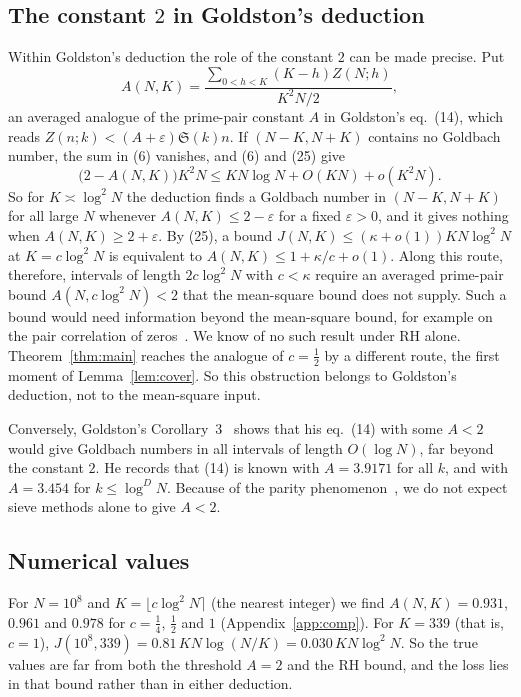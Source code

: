 \documentclass[11pt]{amsart}
\theoremstyle{remark}
\begin{document}
\subsection*{The constant $2$ in Goldston's deduction}
Within Goldston's deduction the role of the constant $2$ can be made precise. Put
\[
A(N,K)=\frac{\sum_{0<h<K}(K-h)Z(N;h)}{K^2N/2},
\]
an averaged analogue of the prime-pair constant $A$ in Goldston's eq.~(14), which reads $Z(n;k)<(A+\varepsilon)\mathfrak S(k)n$. If $(N-K,N+K)$ contains no Goldbach number, the sum in (6) vanishes, and (6) and (25) give
\[
\big(2-A(N,K)\big)K^2N\le KN\log N+O(KN)+o(K^2N).
\]
So for $K\asymp\log^2N$ the deduction finds a Goldbach number in $(N-K,N+K)$ for all large $N$ whenever $A(N,K)\le2-\varepsilon$ for a fixed $\varepsilon>0$, and it gives nothing when $A(N,K)\ge2+\varepsilon$. By (25), a bound $J(N,K)\le(\kappa+o(1))KN\log^2N$ at $K=c\log^2N$ is equivalent to $A(N,K)\le1+\kappa/c+o(1)$. Along this route, therefore, intervals of length $2c\log^2N$ with $c<\kappa$ require an averaged prime-pair bound $A(N,c\log^2N)<2$ that the mean-square bound does not supply. Such a bound would need information beyond the mean-square bound, for example on the pair correlation of zeros~\cite{Montgomery}. We know of no such result under RH alone. Theorem~\ref{thm:main} reaches the analogue of $c=\frac12$ by a different route, the first moment of Lemma~\ref{lem:cover}. So this obstruction belongs to Goldston's deduction, not to the mean-square input.

Conversely, Goldston's Corollary~3~\cite{Goldston} shows that his eq.~(14) with some $A<2$ would give Goldbach numbers in all intervals of length $O(\log N)$, far beyond the constant $2$. He records that (14) is known with $A=3.9171$ for all $k$, and with $A=3.454$ for $k\le\log^DN$. Because of the parity phenomenon~\cite{Bombieri,FI}, we do not expect sieve methods alone to give $A<2$.

\subsection*{Numerical values}
For $N=10^8$ and $K=\lfloor c\log^2N\rceil$ (the nearest integer) we find $A(N,K)=0.931$, $0.961$ and $0.978$ for $c=\frac14$, $\frac12$ and $1$ (Appendix~\ref{app:comp}). For $K=339$ (that is, $c=1$), $J(10^8,339)=0.81\,KN\log(N/K)=0.030\,KN\log^2N$. So the true values are far from both the threshold $A=2$ and the RH bound, and the loss lies in that bound rather than in either deduction.

\end{document}
